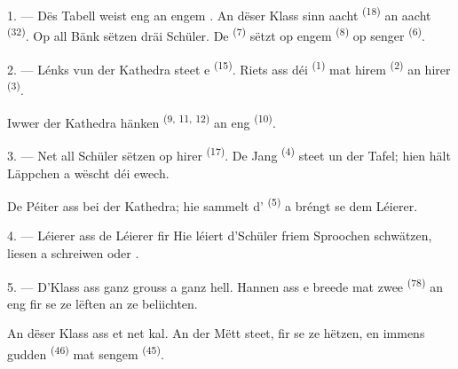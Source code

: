 \VUsaut{2.0mm}
\VUsaut{3.2mm}
\VUsaut{2.6mm}
\VUsaut{3.4mm}
\VUornamento{9pt}
\VUsaut{5.0mm}
\VUsaut{3.0mm}
\VUfilet{16mm}
\VUsaut{5.6mm}

\VUsaut{1.4mm}
\VUsaut{2.2mm}
\VUfilet{20mm}
\VUsaut{6.4mm}

\VUsaut{3.0mm}

1. --- Dës Tabell weist eng  an engem . An dëser Klass
sinn aacht  \textsuperscript{(18)} an aacht 
\textsuperscript{(32)}. Op all Bänk sëtzen dräi Schüler. De 
\textsuperscript{(7)} sëtzt op engem  \textsuperscript{(8)} op senger
 \textsuperscript{(6)}.

2. --- Lénks vun der Kathedra steet e  \textsuperscript{(15)}.
Riets ass déi  \textsuperscript{(1)} mat hirem
 \textsuperscript{(2)} an hirer  \textsuperscript{(3)}.

Iwwer der Kathedra hänken  \textsuperscript{(9, 11, 12)} an eng
 \textsuperscript{(10)}.

3. --- Net all Schüler sëtzen op hirer  \textsuperscript{(17)}. De Jang
\textsuperscript{(4)} steet un der Tafel; hien hält  Läppchen a wëscht déi
 ewech.

De Péiter ass bei der Kathedra; hie sammelt d'
\textsuperscript{(5)} a bréngt se dem Léierer.

4. ---  Léierer ass de Léierer fir  Hie léiert
d'Schüler friem Sproochen schwätzen, liesen a schreiwen  oder .

5. --- D'Klass ass ganz grouss a ganz hell. Hannen ass e breede  mat
zwee  \textsuperscript{(78)} an eng  fir se ze
lëften an ze beliichten.

An dëser Klass ass et net kal. An der Mëtt steet, fir se ze hëtzen, en immens gudden
 \textsuperscript{(46)} mat sengem  \textsuperscript{(45)}.

